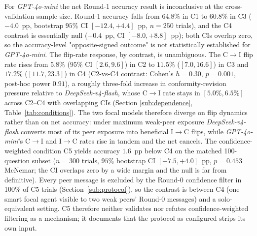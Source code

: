 \documentclass[review,3p,authoryear]{elsarticle}
\begin{document}
For \textit{GPT-4o-mini} the net Round-1 accuracy result is
inconclusive at the cross-validation sample size.
Round-1 accuracy falls from $64.8\%$ in C1 to $60.8\%$ in C3
($-4.0$~pp, bootstrap $95\%$ CI $[-12.4, +4.4]$~pp, $n = 250$
trials), and the C4 contrast is essentially null ($+0.4$~pp, CI
$[-8.0, +8.8]$~pp); both CIs overlap zero, so the accuracy-level
"opposite-signed outcome" is not statistically established for
\textit{GPT-4o-mini}.
The flip-rate response, by contrast, is unambiguous.
The C$\rightarrow$I flip rate rises from $5.8\%$ ($95\%$ CI
$[2.6, 9.6]$) in C2 to $11.5\%$ ($[7.0, 16.6]$) in C3 and $17.2\%$
($[11.7, 23.3]$) in C4 (C2-vs-C4 contrast: Cohen's $h = 0.30$,
$p = 0.001$, post-hoc power $0.91$), a roughly three-fold increase
in conformity-revision pressure relative to
\textit{DeepSeek-v4-flash}, whose C$\rightarrow$I rate stays in
$[5.0\%, 6.5\%]$ across C2--C4 with overlapping CIs (Section
\ref{sub:dependence}, Table~\ref{tab:conditions}).
The two focal models therefore diverge on flip dynamics rather than
on net accuracy: under maximum weak-peer exposure
\textit{DeepSeek-v4-flash} converts most of its peer exposure into
beneficial I$\rightarrow$C flips, while \textit{GPT-4o-mini}'s
C$\rightarrow$I and I$\rightarrow$C rates rise in tandem and the net
cancels.
The confidence-weighted condition C5 yields accuracy $1.6$~pp below
C4 on the matched 100-question subset ($n = 300$ trials, $95\%$
bootstrap CI $[-7.5, +4.0]$~pp, $p = 0.453$ McNemar; the CI overlaps
zero by a wide margin and the null is far from definitive).
Every peer message is excluded by the Round-0 confidence filter in 100\%
of C5 trials (Section~\ref{sub:protocol}), so the contrast is between
C4 (one smart focal agent visible to two weak peers' Round-0 messages)
and a solo-equivalent setting.
C5 therefore neither validates nor refutes confidence-weighted filtering
as a mechanism; it documents that the protocol as configured strips its
own input.
\end{document}
